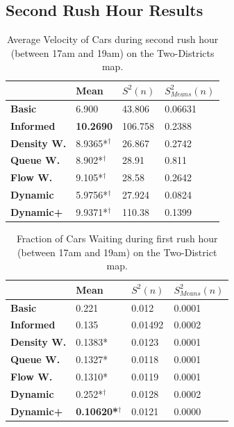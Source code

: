 \documentclass[11pt]{article}
\begin{document}
\begin{appendix}
\clearpage
\section{Second Rush Hour Results}
\begin{table}[h]
\centering
\caption{Average Velocity of Cars during second rush hour (between 17am and 19am) on the Two-Districts map.}
\label{my-label}
\begin{tabular}{l|l|l|l|}
\textbf{}                 & \textbf{Mean} & \textbf{$S^2(n)$} & \textbf{$S_{Means}^2(n)$} \\
\hline\textbf{Basic}      & 6.900           & 43.806            & 0.06631                    \\
\textbf{Informed}   & \textbf{10.2690} & 106.758           & 0.2388                     \\
\hline\textbf{Density W.} & 8.9365*$^\dagger$           & 26.867            & 0.2742                     \\
\textbf{Queue W.}   & 8.902*$^\dagger$            & 28.91             & 0.811                      \\
\textbf{Flow W.}    & 9.105*$^\dagger$            & 28.58             & 0.2642                     \\
\textbf{Dynamic}    & 5.9756*$^\dagger$          & 27.924            & 0.0824                     \\
\textbf{Dynamic+}   & 9.9371*$^\dagger$           & 110.38            & 0.1399                    
\end{tabular}
\end{table}

\begin{table}[h]
\centering
\caption{Fraction of Cars Waiting during first rush hour (between 17am and 19am) on the Two-District map.}
\label{my-label}
\begin{tabular}{l|l|l|l|}
\textbf{}                 & \textbf{Mean} & \textbf{$S^2(n)$} & \textbf{$S_{Means}^2(n)$} \\
\hline\textbf{Basic}      & 0.221            & 0.012             & 0.0001                     \\
\textbf{Informed}   & 0.135            & 0.01492           & 0.0002                     \\
\hline\textbf{Density W.} & 0.1383*           & 0.0123            & 0.0001                     \\
\textbf{Queue W.}   & 0.1327*           & 0.0118            & 0.0001                     \\
\textbf{Flow W.}    & 0.1310*           & 0.0119            & 0.0001                     \\
\textbf{Dynamic}    & 0.252*$^\dagger$            & 0.0128            & 0.0002                     \\
\textbf{Dynamic+}   & \textbf{0.10620*$^\dagger$} & 0.0121            & 0.0000                    
\end{tabular}
\end{table}


\end{appendix}
\end{document}

